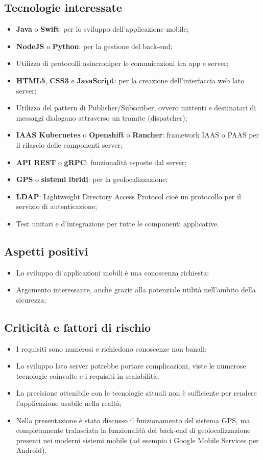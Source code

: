 \subsection{Tecnologie interessate}
\begin{itemize}
	\item \textbf{Java} o \textbf{Swift}: per lo sviluppo dell'applicazione mobile;
	\item \textbf{NodeJS} o \textbf{Python}: per la gestione del back-end;
	\item Utilizzo di protocolli asincroni\glosp per le comunicazioni tra app e server;
	\item \textbf{HTML5}, \textbf{CSS3} e \textbf{JavaScript}: per la creazione dell'interfaccia web lato server;
	\item Utilizzo del pattern di Publisher/Subscriber, ovvero mittenti e destinatari di messaggi dialogano attraverso un tramite (dispatcher\glo);
	\item \textbf{IAAS Kubernetes} o \textbf{Openshift} o \textbf{Rancher}: framework IAAS o PAAS per il rilascio delle componenti server;
	\item \textbf{API REST} o \textbf{gRPC}: funzionalità esposte dal server;
	\item \textbf{GPS} o \textbf{sistemi ibridi}: per la geolocalizzazione;
	\item \textbf{LDAP}: Lightweight Directory Access Protocol cioè un protocollo per il servizio di autenticazione;
	\item Test unitari e d'integrazione per tutte le componenti applicative.
\end{itemize}

\subsection{Aspetti positivi}
\begin{itemize}
	\item Lo sviluppo di applicazioni mobili è una conoscenza richiesta;
	\item Argomento interessante, anche grazie alla potenziale utilità nell'ambito della sicurezza;
\end{itemize}

\subsection{Criticità e fattori di rischio}
\begin{itemize}
	\item I requisiti sono numerosi e richiedono conoscenze non banali;
	\item Lo sviluppo lato server potrebbe portare complicazioni, viste le numerose tecnologie coinvolte e i requisiti in scalabilità;
	\item La precisione ottenibile con le tecnologie attuali non è sufficiente per rendere l’applicazione usabile nella realtà;
	\item Nella presentazione è stato discusso il funzionamento del sistema GPS, ma completamente tralasciata la funzionalità dei back-end di geolocalizzazione presenti nei moderni sistemi mobile (ad esempio i Google Mobile Services per Android).
\end{itemize}

